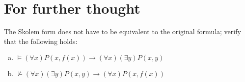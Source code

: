         
\section*{For further thought}

    
\begin{problem}
    
    The Skolem form does not have to be equivalent to the original formula; verify that the following holds:
    \begin{enumerate}[(a)]
        \item $\models (\forall x)P(x,f(x)) \to (\forall x)(\exists y)P(x,y)$
        \item $\not\models (\forall x)(\exists y)P(x,y)\to (\forall x)P(x,f(x))$
    \end{enumerate}

\end{problem}
















 


